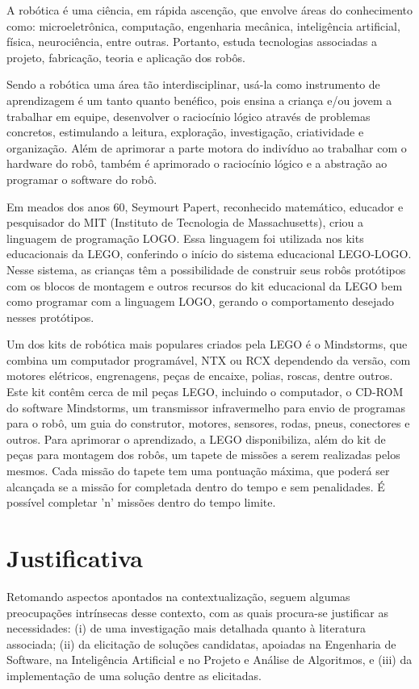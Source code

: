 A robótica é uma ciência, em rápida ascenção, que envolve áreas do conhecimento como: microeletrônica, computação, engenharia mecânica, inteligência artificial, física, neurociência, entre outras. Portanto, estuda tecnologias associadas a projeto, fabricação, teoria e aplicação dos robôs.

Sendo a robótica uma área tão interdisciplinar, usá-la como instrumento de aprendizagem é um tanto quanto benéfico, pois ensina a criança e/ou jovem a trabalhar em equipe, desenvolver o raciocínio lógico através de problemas concretos, estimulando a leitura, exploração, investigação, criatividade e organização. Além de aprimorar a parte motora do indivíduo ao trabalhar com o hardware do robô, também é aprimorado o raciocínio lógico e a abstração ao programar o software do robô. 

Em meados dos anos 60, Seymourt Papert, reconhecido matemático, educador e pesquisador do MIT (Instituto de Tecnologia de Massachusetts), criou a linguagem de programação LOGO. Essa linguagem foi utilizada nos kits educacionais da LEGO, conferindo o início do sistema educacional LEGO-LOGO. Nesse sistema, as crianças têm a possibilidade de construir seus robôs protótipos com os blocos de montagem e outros recursos do kit educacional da LEGO bem como programar com a linguagem LOGO, gerando o comportamento desejado nesses protótipos.

Um dos kits de robótica mais populares criados pela LEGO é o Mindstorms, que combina um computador programável, NTX ou RCX dependendo da versão, com motores elétricos, engrenagens, peças de encaixe, polias, roscas, dentre outros. Este kit contêm cerca de mil peças LEGO, incluindo o computador, o CD-ROM do software Mindstorms, um transmissor infravermelho para envio de programas para o robô, um guia do construtor, motores, sensores, rodas, pneus, conectores e outros. Para aprimorar o aprendizado, a LEGO disponibiliza, além do kit de peças para montagem dos robôs, um tapete de missões a serem realizadas pelos mesmos. Cada missão do tapete tem uma pontuação máxima, que poderá ser alcançada se a missão for completada dentro do tempo e sem penalidades. É possível completar 'n' missões dentro do tempo limite.

\section{Justificativa}

Retomando aspectos apontados na contextualização, seguem algumas preocupações intrínsecas desse contexto, com as quais procura-se justificar as necessidades: (i) de uma investigação mais detalhada quanto à literatura associada; (ii) da elicitação de soluções candidatas, apoiadas na Engenharia de Software, na Inteligência Artificial e no Projeto e Análise de Algoritmos, e (iii) da implementação de uma solução dentre as elicitadas.

